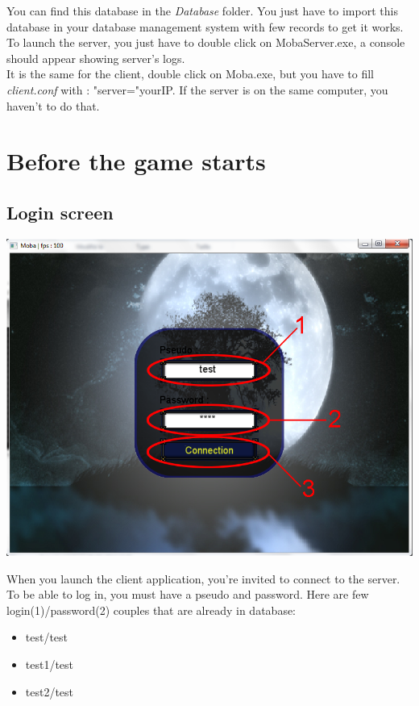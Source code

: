 \documentclass{scrreprt}
\begin{document}
		
		  You can find this database in the \emph{Database} folder. You just have to import this database in your database management system with few records to get it works.\\

		  To launch the server, you just have to double click on MobaServer.exe, a console should appear showing server's logs.\\
		  It is the same for the client, double click on Moba.exe, but  you have to fill \emph{client.conf} with : "server="yourIP. If the server is on the same computer, you haven't to do that.

		  \chapter{Before the game starts}
		  \section{Login screen}
		  \begin{center}
		  \includegraphics[scale=0.4]{connection_screen.png}
		  \end{center}
		  When you launch the client application, you're invited to connect to the server. To be able to log in, you must have a pseudo and password. Here are few login(1)/password(2) couples that are already in database:
		  \begin{itemize}
		  \item{test/test}
		  \item{test1/test}
		  \item{test2/test}
		  \end{itemize}
\end{document}
